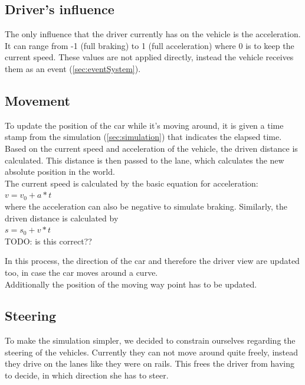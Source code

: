 \subsection{Driver's influence}
\label{sec:driverInfluence}

The only influence that the driver currently has on the vehicle is the 
acceleration. It can range from -1 (full braking) to 1 (full acceleration)
where 0 is to keep the current speed. These values are not applied directly,
instead the vehicle receives them as an event (\ref{sec:eventSystem}).

\subsection{Movement}

To update the position of the car while it's moving around, it is given
a time stamp from the simulation (\ref{sec:simulation}) that indicates 
the elapsed time. Based on the current speed and acceleration of the 
vehicle, the driven distance is calculated. This distance is then passed
to the lane, which calculates the new absolute position in the world. \\

\noindent The current speed is calculated by the basic equation for
acceleration: \\

$ v = v_0 + a * t$ \\

\noindent where the acceleration can also be negative to simulate braking.
Similarly, the driven distance is calculated by \\

$ s = s_0 + v * t $ \\

TODO: is this correct??

\noindent In this process, the direction of the car and therefore the driver
view are updated too, in case the car moves around a curve. \\

\noindent Additionally the position of the moving way point has to be updated.

\subsection{Steering}
\label{sec:steering}

To make the simulation simpler, we decided to constrain ourselves regarding
the steering of the vehicles. Currently they can not move around quite freely, 
instead they drive on the lanes like they were on rails. This frees the 
driver from having to decide, in which direction she has to steer.


